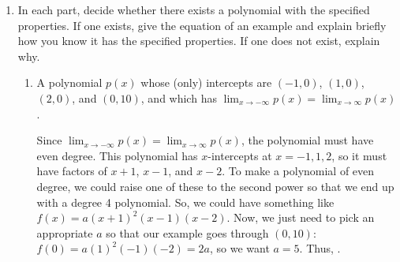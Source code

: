 \documentclass{article}
\theoremstyle{theorem}
\begin{document}
\begin{enumerate}
\begin{enumerate}
    \begin{solution}
      We know that the graph of $g$ includes $(-3, 4)$ and $(1, -3)$, and it's continuous between these two points. Any continuous graph that includes both these points must cross the $x$-axis, so this is . 
    \end{solution}

  \item
    \begin{problem}[\vfill]
      $g$ has {\it at least} one $x$-intercept on $(1, 5)$.
    \end{problem}

    \begin{solution}
      This is  since $g$ doesn't have to be continuous on all of $(1, 5)$, The graph in \ref{fall2012-ma-midterm1-3-II-a} is an example for which the statement is false. 
    \end{solution}

  \end{enumerate}

\item \label{fall2018-prefinal-practice3-3}  

  In each part, decide whether there exists a polynomial with the specified properties.  If one exists, give the equation of an example and explain briefly how you know it has the specified properties.  If one does not exist, explain why.

  \begin{enumerate}

  \item
    \begin{problem}[\nstretch{1.75}]
      A polynomial $p(x)$ whose (only) intercepts are $(-1, 0)$, $(1, 0)$, $(2, 0)$, and $(0, 10)$, and which has $\displaystyle \lim_{x \to -\infty} p(x) = \lim_{x \to \infty} p(x)$.  
    \end{problem}

    \begin{solution}
      Since $\displaystyle \lim_{x \to -\infty} p(x) = \lim_{x \to \infty} p(x)$, the polynomial must have even degree. This polynomial has $x$-intercepts at $x = -1, 1, 2$, so it must have factors of $x + 1$, $x - 1$, and $x - 2$. To make a polynomial of even degree, we could raise one of these to the second power so that we end up with a degree 4 polynomial. So, we could have something like $f(x) = a(x + 1)^2 (x - 1)(x - 2)$. Now, we just need to pick an appropriate $a$ so that our example goes through $(0, 10)$: $f(0) = a (1)^2 (-1)(-2) = 2a$, so we want $a = 5$. Thus, .
    \end{solution}


\end{enumerate}
\end{enumerate}
\end{document}
